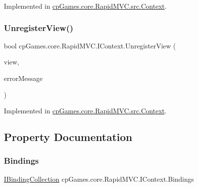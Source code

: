 Implemented in \mbox{\hyperlink{classcp_games_1_1core_1_1_rapid_m_v_c_1_1src_1_1_context_a7de73496fa8c30c2dfc84cb3e58c7543}{cp\+Games.\+core.\+Rapid\+M\+V\+C.\+src.\+Context}}.

\mbox{\label{interfacecp_games_1_1core_1_1_rapid_m_v_c_1_1_i_context_a86f05401110f08cbc79a83fd4366d505}} 
\subsubsection{\texorpdfstring{UnregisterView()}{UnregisterView()}}
{\footnotesize\ttfamily bool cp\+Games.\+core.\+Rapid\+M\+V\+C.\+I\+Context.\+Unregister\+View (\begin{DoxyParamCaption}\item[{\mbox{\hyperlink{interfacecp_games_1_1core_1_1_rapid_m_v_c_1_1_i_view}{I\+View}}}]{view,  }\item[{out string}]{error\+Message }\end{DoxyParamCaption})}



Implemented in \mbox{\hyperlink{classcp_games_1_1core_1_1_rapid_m_v_c_1_1src_1_1_context_a5f033c640e3b84d53ff2bf330e2baf58}{cp\+Games.\+core.\+Rapid\+M\+V\+C.\+src.\+Context}}.



\subsection{Property Documentation}
\mbox{\label{interfacecp_games_1_1core_1_1_rapid_m_v_c_1_1_i_context_a5aba456e160e86d5da856d6d823ac393}} 
\subsubsection{\texorpdfstring{Bindings}{Bindings}}
{\footnotesize\ttfamily \mbox{\hyperlink{interfacecp_games_1_1core_1_1_rapid_m_v_c_1_1_i_binding_collection}{I\+Binding\+Collection}} cp\+Games.\+core.\+Rapid\+M\+V\+C.\+I\+Context.\+Bindings\hspace{0.3cm}{\ttfamily [get]}}

